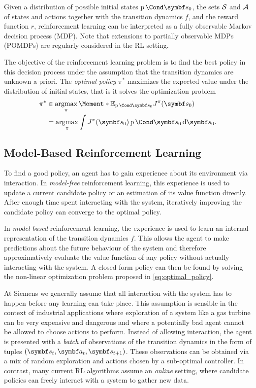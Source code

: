 Given a distribution of possible initial states $\Prob{\mat{s}_0}$, the sets $\mathcal{S}$ and $\mathcal{A}$ of states and actions together with the transition dynamics $f$, and the reward function $r$, reinforcement learning can be interpreted as a fully observable Markov decision process (MDP).
Note that extensions to partially observable MDPs (POMDPs) are regularly considered in the RL setting.

The objective of the reinforcement learning problem is to find the best policy in this decision process under the assumption that the transition dynamics are unknown a priori.
The \emph{optimal policy} $\pi^*$ maximizes the expected value under the distribution of initial states, that is it solves the optimization problem
\begin{align}
    \label{eq:optimal_policy}
    \begin{split}
        \pi^\ast &\in \argmax_{\pi} \Moment*{\E_{\Prob{\mat{s}_0}}}{J^\pi(\mat{s}_0)} \\
        &= \argmax_{\pi} \int J^\pi(\mat{s}_0) \Prob{\mat{s}_0} \diff \mat{s}_0.
    \end{split}
\end{align}


\subsection{Model-Based Reinforcement Learning}
To find a good policy, an agent has to gain experience about its environment via interaction.
In \emph{model-free} reinforcement learning, this experience is used to update a current candidate policy or an estimation of its value function directly.
After enough time spent interacting with the system, iteratively improving the candidate policy can converge to the optimal policy.

In \emph{model-based} reinforcement learning, the experience is used to learn an internal representation of the transition dynamics $f$.
This allows the agent to make predictions about the future behaviour of the system and therefore approximatively evaluate the value function of any policy without actually interacting with the system.
A closed form policy can then be found by solving the non-linear optimization problem proposed in \cref{eq:optimal_policy}.

At Siemens we generally assume that all interaction with the system has to happen before any learning can take place.
This assumption is sensible in the context of industrial applications where exploration of a system like a gas turbine can be very expensive and dangerous and where a potentially bad agent cannot be allowed to choose actions to perform.
Instead of allowing interaction, the agent is presented with a \emph{batch} of observations of the transition dynamics in the form of tuples $(\mat{s_t}, \mat{a_t}, \mat{s_{t+1}})$.
These observations can be obtained via a mix of random exploration and actions chosen by a sub-optimal controller.
In contrast, many current RL algorithms assume an \emph{online} setting, where candidate policies can freely interact with a system to gather new data.

